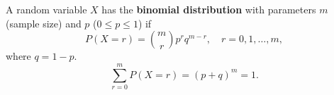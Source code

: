 A random variable $X$ has the \textbf{binomial distribution} with parameters $m$ (sample size) and $p$ ($0 \leq p \leq 1$) if
$$P(X = r) = \binom{m}{r} p^r q^{m-r}, \quad r = 0, 1, \ldots, m,$$
where $q = 1 - p$.
$$\sum_{r=0}^{m} P(X = r) = (p + q)^m = 1.$$

